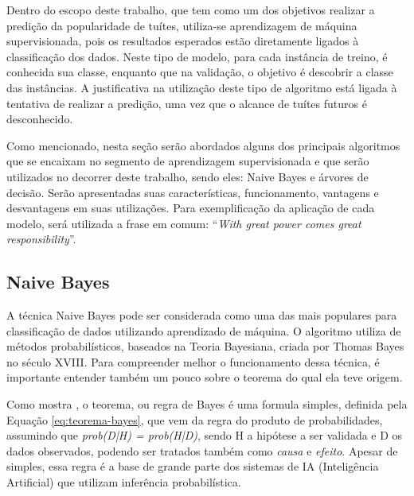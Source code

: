 \documentclass[oneside,openright,12pt]{ufsm_2015} %
\begin{document}
    \par Dentro do escopo deste trabalho, que tem como um dos objetivos realizar a predição da popularidade de tuítes, utiliza-se aprendizagem de máquina supervisionada, pois os resultados esperados estão diretamente ligados à classificação dos dados. Neste tipo de modelo, para cada instância de treino, é conhecida sua classe, enquanto que na validação, o objetivo é descobrir a classe das instâncias. A justificativa na utilização deste tipo de algoritmo está ligada à tentativa de realizar a predição, uma vez que o alcance de tuítes futuros é desconhecido.
    
    \par Como mencionado, nesta seção serão abordados alguns dos principais algoritmos que se encaixam no segmento de aprendizagem supervisionada e que serão utilizados no decorrer deste trabalho, sendo eles: Naive Bayes e árvores de decisão. Serão apresentadas suas características, funcionamento, vantagens e desvantagens em suas utilizações. Para exemplificação da aplicação de cada modelo, será utilizada a frase em comum: ``\textit{With great power comes great responsibility}''.


\subsection{Naive Bayes}
\label{sec:fund-naive-bayes}

    \par A técnica Naive Bayes pode ser considerada como uma das mais populares para classificação de dados utilizando aprendizado de máquina. O algoritmo utiliza de métodos probabilísticos, baseados na Teoria Bayesiana, criada por Thomas Bayes no século XVIII. Para compreender melhor o funcionamento dessa técnica, é importante entender também um pouco sobre o teorema do qual ela teve origem.

    \par Como mostra \cite{book:russell:10}, o teorema, ou regra de Bayes é uma formula simples, definida pela Equação \ref{eq:teorema-bayes}, que vem da regra do produto de probabilidades, assumindo que \textit{prob(D|H) = prob(H|D)}, sendo H a hipótese a ser validada e D os dados observados, podendo ser tratados também como \textit{causa} e \textit{efeito}. Apesar de simples, essa regra é a base de grande parte dos sistemas de IA (Inteligência Artificial) que utilizam inferência probabilística.
    
\end{document}
